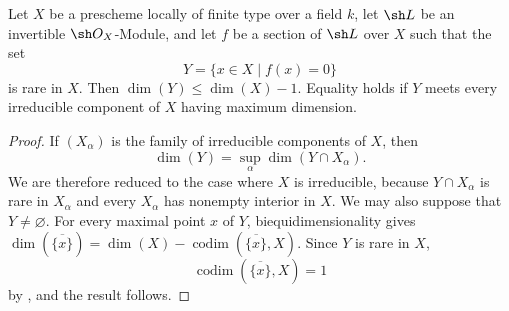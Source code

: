 \begin{corollary}[5.2.4]
\label{IV.5.2.4}
Let $X$ be a prescheme locally of finite type over a field $k$, let
$\sh L$ be an invertible $\sh O_X$-Module, and let $f$ be a section
of $\sh L$ over $X$ such that the set
\[
Y=\{x\in X\mid f(x)=0\}
\]
is rare in $X$.
Then $\dim(Y)\leq\dim(X)-1$.
Equality holds if $Y$ meets every irreducible component of $X$ having
maximum dimension.
\end{corollary}

\begin{proof}
If $(X_\alpha)$ is the family of irreducible components of $X$, then
\[
\dim(Y)=\sup_\alpha\dim(Y\cap X_\alpha).
\]
We are therefore reduced to the case where $X$ is irreducible,
because $Y\cap X_\alpha$ is rare in $X_\alpha$ and every
$X_\alpha$ has nonempty interior in $X$.
We may also suppose that $Y\ne\varnothing$.
For every maximal point $x$ of $Y$, biequidimensionality gives $\dim(\overline{\{x\}})
=\dim(X)-\operatorname{codim}(\overline{\{x\}},X)$.
Since $Y$ is rare in $X$,
\[
\operatorname{codim}(\overline{\{x\}},X)=1
\]
by , and the result follows.
\end{proof}

